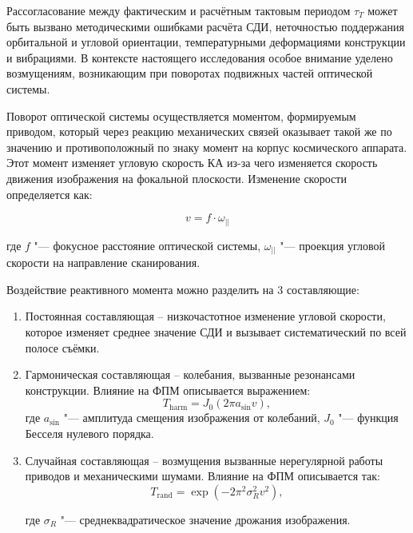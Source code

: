 Рассогласование между фактическим и расчётным тактовым периодом $\tau_T$ может быть вызвано методическими ошибками расчёта СДИ, неточностью поддержания орбитальной и угловой ориентации, температурными деформациями конструкции и вибрациями. В контексте настоящего исследования особое внимание уделено возмущениям, возникающим при поворотах подвижных частей оптической системы.

Поворот оптической системы осуществляется моментом, формируемым приводом, который через реакцию механических связей оказывает  такой же по значению и противоположный по знаку момент на корпус космического аппарата. Этот момент изменяет  угловую скорость КА из-за чего изменяется скорость движения изображения на фокальной плоскости. Изменение скорости определяется как:

\begin{equation}
	\label{eq:eq_spdiimage}
	v = f \cdot \omega_{||}
\end{equation}

где \(f\) "--- фокусное расстояние оптической системы, \(\omega_{||}\) "--- проекция угловой скорости на направление сканирования.

Воздействие реактивного момента можно разделить на 3 составляющие:

\begin{enumerate}
	\item Постоянная составляющая -- низкочастотное изменение угловой скорости, которое изменяет среднее значение СДИ  и вызывает систематический \blur по всей полосе съёмки. 
	\item Гармоническая составляющая -- колебания, вызванные резонансами конструкции. Влияние на ФПМ описывается выражением:
	\begin{equation}
		\label{eq:eq_fmpHarmonic}
		T_{\text{harm}} = J_0(2\pi a_{\sin} v),
	\end{equation}
	где \(a_{\sin}\) "--- амплитуда смещения изображения от колебаний, \(J_0\) "--- функция Бесселя нулевого порядка.
	\item Случайная составляющая -- возмущения вызванные нерегулярной работы приводов и механическими шумами. Влияние на ФПМ описывается так:
	\begin{equation}
		\label{eq:eq_fmpExp}
		T_{\text{rand}} = \exp(-2\pi^2 \sigma_R^2 v^2),
	\end{equation}
	
	где \(\sigma_R\) "--- среднеквадратическое значение дрожания изображения. 
\end{enumerate}

